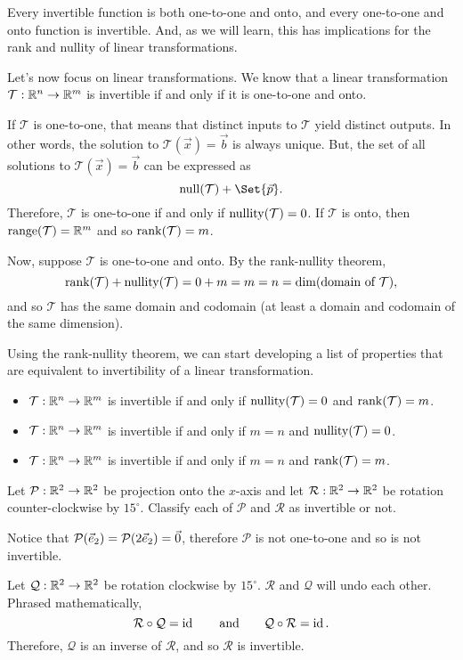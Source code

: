 
Every invertible function is both one-to-one and onto, and every one-to-one and onto function
is invertible. And, as we will learn, this has implications for the rank and nullity of linear transformations.


Let's now focus on linear transformations. We know that a linear transformation $\mathcal T:\mathbb{R}^n\to\mathbb{R}^m$ is
invertible if and only if it is one-to-one and onto. 

If $\mathcal T$ is one-to-one, that means that distinct inputs to $\mathcal T$ yield distinct outputs. In other words,
the solution to $\mathcal T(\vec x)=\vec b$ is always unique. But, the set of all solutions to $\mathcal T(\vec x)=\vec b$
can be expressed as
\[
	\Null(\mathcal T)+\Set{\vec p}.
\]
Therefore, $\mathcal T$ is one-to-one if and only if $\operatorname{nullity}(\mathcal T)=0$.
If $\mathcal T$ is onto, then $\operatorname{range}(\mathcal T)=\mathbb{R}^m$ and so $\operatorname{rank}(\mathcal T)=m$. 

Now, suppose $\mathcal T$ is one-to-one and onto. By the rank-nullity theorem,
\[
	\operatorname{rank}(\mathcal T)+\operatorname{nullity}(\mathcal T) = 0+m=m=n=\operatorname{dim}(\text{domain of $\mathcal T$}),
\]
and so $\mathcal T$ has the same domain and codomain (at least a domain and codomain of the same dimension).

Using the rank-nullity theorem, we can start developing a list of properties that are equivalent to invertibility of a
linear transformation.
\begin{itemize}
	\item $\mathcal T:\mathbb{R}^n\to\mathbb{R}^m$ is invertible if and only if $\operatorname{nullity}(\mathcal T)=0$ and $\operatorname{rank}(\mathcal T)=m$.
	\item $\mathcal T:\mathbb{R}^n\to\mathbb{R}^m$ is invertible if and only if $m=n$ and $\operatorname{nullity}(\mathcal T)=0$.
	\item $\mathcal T:\mathbb{R}^n\to\mathbb{R}^m$ is invertible if and only if $m=n$ and $\operatorname{rank}(\mathcal T)=m$.
\end{itemize}

\begin{example}
	Let $\mathcal P:\mathbb{R}^2\to\mathbb{R}^2$ be projection onto the $x$-axis and let $\mathcal R:\mathbb{R}^2\to\mathbb{R}^2$ be rotation counter-clockwise
	by $15^\circ$. Classify each of $\mathcal P$ and $\mathcal R$ as invertible or not.
	
	\medskip
	Notice that $\mathcal P({\vec e_2})=\mathcal P(2{\vec e_2})=\vec 0$, therefore $\mathcal P$ is not one-to-one and so is not invertible.
	
	\medskip
	Let $\mathcal Q: \mathbb{R}^2\to\mathbb{R}^2$ be rotation clockwise by $15^\circ$. $\mathcal R$ and $\mathcal Q$ will undo each other. Phrased mathematically,
	\[
	    \mathcal R\circ \mathcal Q=\operatorname{\operatorname{id}}\qquad\text{and}\qquad \mathcal Q\circ \mathcal R=\operatorname{\operatorname{id}}.
	\]
	Therefore, $\mathcal Q$ is an inverse of $\mathcal R$, and so $\mathcal R$ is invertible. 
\end{example}

